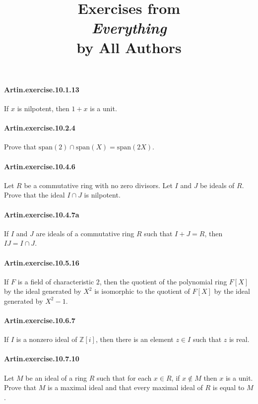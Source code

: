 \documentclass{article}
\title{\textbf{
Exercises from \\
\textit{Everything} \\
by All Authors
}}
\date{}
\begin{document}
\maketitle

\paragraph{Artin.exercise.10.1.13} If $x$ is nilpotent, then $1+x$ is a unit.

\paragraph{Artin.exercise.10.2.4} Prove that $\mathrm{span}(2) \cap \mathrm{span}(X) = \mathrm{span}(2X)$.

\paragraph{Artin.exercise.10.4.6} Let $R$ be a commutative ring with no zero divisors. Let $I$ and $J$ be ideals of $R$. Prove that the ideal $I\cap J$ is nilpotent.

\paragraph{Artin.exercise.10.4.7a} If $I$ and $J$ are ideals of a commutative ring $R$ such that $I+J=R$, then $IJ=I\cap J$.

\paragraph{Artin.exercise.10.5.16} If $F$ is a field of characteristic $2$, then the quotient of the polynomial ring $F[X]$ by the ideal generated by $X^2$ is isomorphic to the quotient of $F[X]$ by the ideal generated by $X^2-1$.

\paragraph{Artin.exercise.10.6.7} If $I$ is a nonzero ideal of $\mathbb{Z}[i]$, then there is an element $z\in I$ such that $z$ is real.

\paragraph{Artin.exercise.10.7.10} Let $M$ be an ideal of a ring $R$ such that for each $x\in R$, if $x\notin M$ then $x$ is a unit. Prove that $M$ is a maximal ideal and that every maximal ideal of $R$ is equal to $M$.
\end{document}
